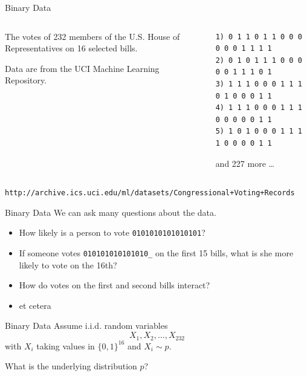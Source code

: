 \documentclass[xcolor=dvipsnames]{beamer}
\begin{document}
\begin{frame}[fragile]{Binary Data}

    \lspace
    \lspace
    \begin{columns}

    \begin{column}{0.42\textwidth}
        The votes of 232 members of the U.S. House of Representatives on
        16 selected bills.  
        
        Data are from the UCI Machine Learning Repository.
    \end{column}

    \begin{column}{0.58\textwidth}
    \begin{center}
    \begin{verbatim}
1) 0 1 1 0 1 1 0 0 0 0 0 0 1 1 1 1
2) 0 1 0 1 1 1 0 0 0 0 0 1 1 1 0 1
3) 1 1 1 0 0 0 1 1 1 0 1 0 0 0 1 1
4) 1 1 1 0 0 0 1 1 1 0 0 0 0 0 1 1
5) 1 0 1 0 0 0 1 1 1 1 0 0 0 0 1 1
    \end{verbatim}
    and 227 more \ldots
    \end{center}
    \end{column}

    \end{columns}
        
    \lspace
    {\footnotesize
    \texttt{http://archive.ics.uci.edu/ml/datasets/Congressional+Voting+Records}
    }

\end{frame}

\begin{frame}{Binary Data}
    We can ask many questions about the data.
    \begin{itemize}
    \item How likely is a person to vote \texttt{0101010101010101}?
    \item If someone votes \texttt{010101010101010\_} on the first 15
    bills, what is she more likely to vote on the 16th?
    \item How do votes on the first and second bills interact?
    \item et cetera
    \end{itemize}
\end{frame}

\begin{frame}{Binary Data}
    Assume i.i.d. random variables
    \[
        X_1, X_2, \ldots, X_{232}
    \]
    with $X_i$ taking values in $\{0, 1\}^{16}$ and $X_i \sim p$.

    What is the underlying distribution $p$?
\end{frame}
\end{document}
